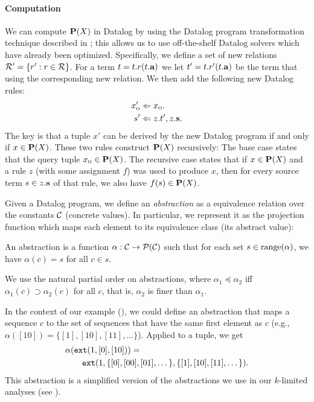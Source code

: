 \paragraph{Computation}

We can compute $\mathbf{P}(X)$ in Datalog by using the Datalog program transformation technique described in 
\cite{liang11minimal}; this allows us to use off-the-shelf Datalog solvers which have already been optimized.
Specifically, we define a set of new relations $\mathcal{R}' = \{ r' : r \in \mathcal{R} \}$.
For a term $t = t.r(t.\mathbf{a})$ we let $t' = t.r'(t.\mathbf{a})$ be the term that using the corresponding new relation.
We then add the following new Datalog rules:
\begin{align}
x_\text{\sc o}' &\Leftarrow x_\text{\sc o}. \label{eqn:revBase} \\
s'   &\Leftarrow z.t', z.\mathbf{s}. \label{eqn:indBase}
\end{align}
The key is that a tuple $x'$ can be derived by the new Datalog program if and only if $x \in \mathbf{P}(X)$.
These two rules construct $\mathbf{P}(X)$ recursively:
The base case  states that the query tuple $x_\text{\sc o} \in \mathbf{P}(X)$.
The recursive case  states that if $x \in \mathbf{P}(X)$ and a rule $z$ (with some assignment $f$)
was used to produce $x$, then for every source term $s \in z.\mathbf{s}$ of that rule,
we also have $f(s) \in \mathbf{P}(X)$.


Given a Datalog program, we define an {\em abstraction} as a equivalence relation over
the constants $\mathcal{C}$ (concrete values).  In particular, we represent it as the projection
function which maps each element to its equivalence class (its abstract value):
\begin{definition}
\label{def:abstraction}
An abstraction is a function $\alpha : \mathcal{C} \to \mathcal{P}(\mathcal{C})$
such that for each set $s \in \text{range}(\alpha)$,
we have $\alpha(c) = s$ for all $c \in s$.
\end{definition}
We use the natural partial order on abstractions,
where $\alpha_1 \preceq \alpha_2$ iff $\alpha_1(c) \supset \alpha_2(c)$ for all $c$,
that is, $\alpha_2$ is finer than $\alpha_1$.

In the context of our example (),
we could define an abstraction
that maps a sequence $c$ to the set of sequences that have the same first element as $c$
(e.g., $\alpha([10]) = \{ [1], [10], [11], \dots \}$).
Applied to a tuple, we get
\begin{align}
& \alpha(\text{\tt ext}(1, [0], [10])) = \\
& \quad\quad \text{\tt ext}(1, \{[0], [00], [01], \dots\}, \{[1], [10], [11], \dots\}). \nonumber
\end{align}
This abstraction is a simplified version of the abstractions we use in our
$k$-limited analyses (see ).

